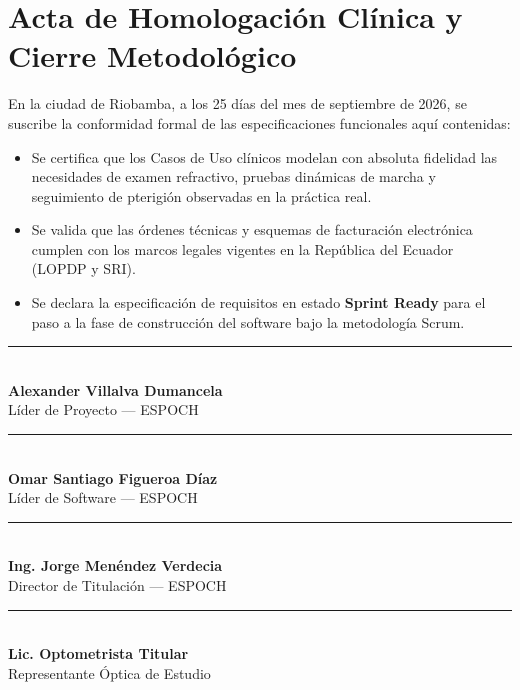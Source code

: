 \documentclass[12pt,a4paper]{report}
\begin{document}
\section{Acta de Homologación Clínica y Cierre Metodológico}
En la ciudad de Riobamba, a los 25 días del mes de septiembre de 2026, se suscribe la conformidad formal de las especificaciones funcionales aquí contenidas:
\begin{itemize}
    \item Se certifica que los Casos de Uso clínicos modelan con absoluta fidelidad las necesidades de examen refractivo, pruebas dinámicas de marcha y seguimiento de pterigión observadas en la práctica real.
    \item Se valida que las órdenes técnicas y esquemas de facturación electrónica cumplen con los marcos legales vigentes en la República del Ecuador (LOPDP y SRI).
    \item Se declara la especificación de requisitos en estado \textbf{Sprint Ready} para el paso a la fase de construcción del software bajo la metodología Scrum.
\end{itemize}

\vspace{1.5cm}
\noindent
\begin{minipage}{0.48\textwidth}
    \centering
    \rule{0.8\textwidth}{0.4pt}\\
    \textbf{Alexander Villalva Dumancela}\\
    \small Líder de Proyecto --- ESPOCH
\end{minipage}
\hfill
\begin{minipage}{0.48\textwidth}
    \centering
    \rule{0.8\textwidth}{0.4pt}\\
    \textbf{Omar Santiago Figueroa Díaz}\\
    \small Líder de Software --- ESPOCH
\end{minipage}

\vspace{1.2cm}
\noindent
\begin{minipage}{0.48\textwidth}
    \centering
    \rule{0.8\textwidth}{0.4pt}\\
    \textbf{Ing. Jorge Menéndez Verdecia}\\
    \small Director de Titulación --- ESPOCH
\end{minipage}
\hfill
\begin{minipage}{0.48\textwidth}
    \centering
    \rule{0.8\textwidth}{0.4pt}\\
    \textbf{Lic. Optometrista Titular}\\
    \small Representante Óptica de Estudio
\end{minipage}
\end{document}
